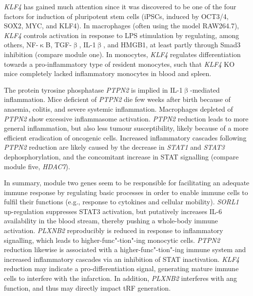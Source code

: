 \emph{KLF4} has gained much attention since it was discovered to be one of the four factors for induction of pluripotent stem cells (iPSCs, induced by OCT3/4, SOX2, MYC, and KLF4).\cite{Takahashi2006} In macrophages (often using the model RAW264.7), \emph{KLF4} controls activation in response to LPS stimulation by regulating, among others, NF-$\upkappa$B, TGF-$\upbeta$, IL-1$\upbeta$, and HMGB1, at least partly through Smad3 inhibition (compare module one).\cite{Feinberg2005,Liu2008,Liu2012} In monocytes, \emph{KLF4} regulates differentiation towards a pro-inflammatory type of resident monocytes, such that \emph{KLF4} KO mice completely lacked inflammatory monocytes in blood and spleen.\cite{Feinberg2007,Alder2008,Kurotaki2013}

The protein tyrosine phosphatase \emph{PTPN2} is implied in IL-1$\upbeta$-mediated inflammation. Mice deficient of \emph{PTPN2} die few weeks after birth because of anaemia, colitis, and severe systemic inflammation. Macrophages depleted of \emph{PTPN2} show excessive inflammasome activation. \emph{PTPN2} reduction leads to more general inflammation, but also less tumour susceptibility, likely because of a more efficient eradication of oncogenic cells.\cite{Spalinger2018} Increased inflammatory cascades following \emph{PTPN2} reduction are likely caused by the decrease in \emph{STAT1} and \emph{STAT3} dephosphorylation, and the concomitant increase in STAT signalling (compare module five, \emph{HDAC7}).\cite{Kim2018a}
 
In summary, module two genes seem to be responsible for facilitating an adequate immune response by regulating basic processes in order to enable immune cells to fulfil their functions (e.g., response to cytokines and cellular mobility). \emph{SORL1} up-regulation suppresses STAT3 activation, but putatively increases IL-6 availability in the blood stream, thereby pushing a whole-body immune activation. \emph{PLXNB2} reproducibly is reduced in response to inflammatory signalling, which leads to higher-func"-tion"-ing monocytic cells. \emph{PTPN2} reduction likewise is associated with a higher-func"-tion"-ing immune system and increased inflammatory cascades via an inhibition of STAT inactivation. \emph{KLF4} reduction may indicate a pro-differentiation signal, generating mature immune cells to interfere with the infarction. In addition, \emph{PLXNB2} interferes with \ac{ang} function, and thus may directly impact tRF generation. 

